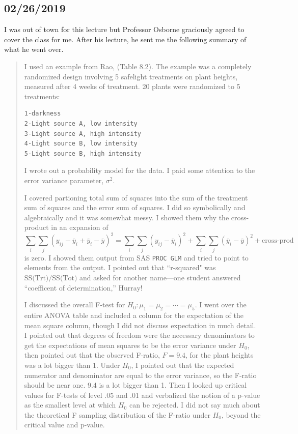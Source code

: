 \documentclass[a4paper, 12pt]{article}
\theoremstyle{plain}
\theoremstyle{definition}
\theoremstyle{remark}
\begin{document}
\subsection*{02/26/2019}

I was out of town for this lecture but Professor Osborne graciously agreed to cover the class for me.  After his lecture, he sent me the following summary of what he went over.  

{\small
\begin{quote}

I used an example from Rao, (Table 8.2).  The example was a completely randomized design involving 5 safelight treatments on plant heights, 
measured after 4 weeks of treatment.  20 plants were randomized to 5 treatments:
\begin{verbatim}
1-darkness
2-Light source A, low intensity
3-Light source A, high intensity
4-Light source B, low intensity
5-Light source B, high intensity
\end{verbatim}
I wrote out a probability model for the data.  I paid some attention to the error variance parameter, $\sigma^2$.

I covered partioning total sum of squares into the sum of the treatment sum of squares and the error sum of squares. I did so symbolically and algebraically and it was somewhat messy.  I showed them why the cross-product in an expansion of 
\[ \sum_i \sum_j (y_{ij} - \bar y_i + \bar y_i - \bar y)^2 = \sum_i \sum_j (y_{ij} - \bar y_i)^2 + \sum_i \sum_j (\bar y_i - \bar y)^2 + \text{cross-prod} \]
is zero.  I showed them output from SAS {\tt PROC GLM} and tried to point to elements from the output.  I pointed out that ``r-squared" was $\text{SS(Trt)}/\text{SS(Tot)}$ and asked for another name---one student answered ``coefficent of determination,'' Hurray!

I discussed the overall F-test for $H_0: \mu_1=\mu_2=\cdots=\mu_5$.   I went over the entire ANOVA table and included a column for the
expectation of the mean square column, though I did not discuss expectation in much detail.  I pointed out that degrees
of freedom were the necessary denominators to get the expectations of mean squares to be the error variance under $H_0$, then
pointed out that the observed F-ratio, $F=9.4$, for the plant heights was a lot bigger than 1.  Under $H_0$, I pointed out
that the expected numerator and denominator are equal to the error variance, so the F-ratio should be near one.  9.4 is a 
lot bigger than 1.  Then I looked up critical values for F-tests of level .05 and .01 and verbalized the notion of a p-value 
as the smallest level at which $H_0$ can be rejected.  I did not say much about the theoretical F sampling distribution of the
F-ratio under $H_0$, beyond the critical value and p-value.


\end{quote}}
\end{document}
